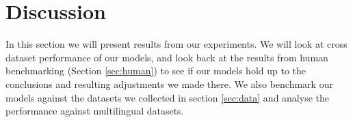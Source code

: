 \section{Discussion}
\label{sec:discussion}
In this section we will present results from our experiments. We will look at cross dataset performance of our models, and look back at the results from human benchmarking (Section \ref{sec:human}) to see if our models hold up to the conclusions and resulting adjustments we made there. We also benchmark our models against the datasets we collected in section \ref{sec:data} and analyse the performance against multilingual datasets.





